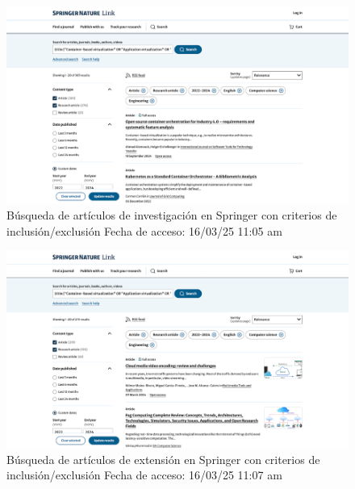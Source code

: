 \FloatBarrier\begin{figure}[H]
    \centering
    \includegraphics[width=\textwidth,keepaspectratio]{apendices/BD/criterios/Springer-inv.png}
    \caption{Búsqueda de artículos de investigación en Springer con criterios de inclusión/exclusión
    Fecha de acceso: 16/03/25 11:05 am
    }\label{fig:busqueda23}
\end{figure}
\FloatBarrier\begin{figure}[H]
    \centering
    \includegraphics[width=\textwidth,keepaspectratio]{apendices/BD/criterios/Springer-ind.png}
    \caption{Búsqueda de artículos de extensión en Springer con criterios de inclusión/exclusión
    Fecha de acceso: 16/03/25 11:07 am
    }\label{fig:busqueda24}
\end{figure}
